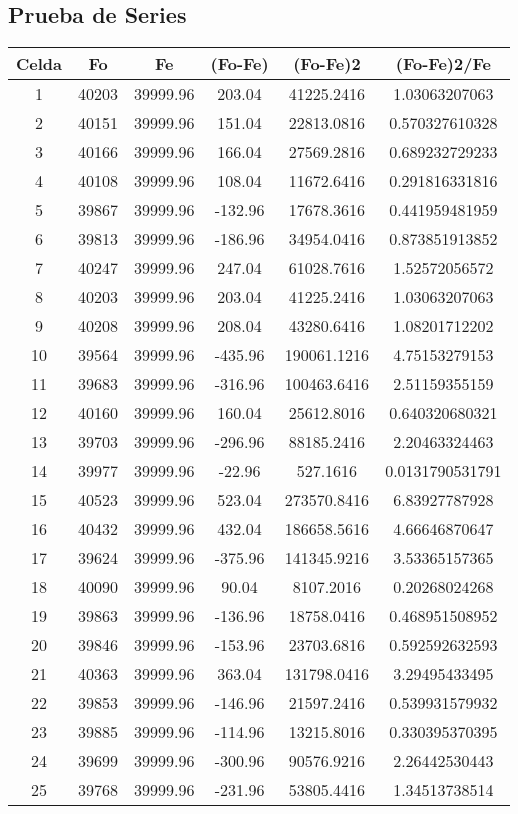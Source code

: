 \documentclass{article}
\begin{document}
\subsection{Prueba de Series}
\begin{tabular}{|c|c|c|c|c|c|}
Celda&Fo&Fe&(Fo{-}Fe)&(Fo{-}Fe)2&(Fo{-}Fe)2/Fe\\
\hline
1&40203&39999.96&203.04&41225.2416&1.03063207063\\
\hline
2&40151&39999.96&151.04&22813.0816&0.570327610328\\
\hline
3&40166&39999.96&166.04&27569.2816&0.689232729233\\
\hline
4&40108&39999.96&108.04&11672.6416&0.291816331816\\
\hline
5&39867&39999.96&{-}132.96&17678.3616&0.441959481959\\
\hline
6&39813&39999.96&{-}186.96&34954.0416&0.873851913852\\
\hline
7&40247&39999.96&247.04&61028.7616&1.52572056572\\
\hline
8&40203&39999.96&203.04&41225.2416&1.03063207063\\
\hline
9&40208&39999.96&208.04&43280.6416&1.08201712202\\
\hline
10&39564&39999.96&{-}435.96&190061.1216&4.75153279153\\
\hline
11&39683&39999.96&{-}316.96&100463.6416&2.51159355159\\
\hline
12&40160&39999.96&160.04&25612.8016&0.640320680321\\
\hline
13&39703&39999.96&{-}296.96&88185.2416&2.20463324463\\
\hline
14&39977&39999.96&{-}22.96&527.1616&0.0131790531791\\
\hline
15&40523&39999.96&523.04&273570.8416&6.83927787928\\
\hline
16&40432&39999.96&432.04&186658.5616&4.66646870647\\
\hline
17&39624&39999.96&{-}375.96&141345.9216&3.53365157365\\
\hline
18&40090&39999.96&90.04&8107.2016&0.20268024268\\
\hline
19&39863&39999.96&{-}136.96&18758.0416&0.468951508952\\
\hline
20&39846&39999.96&{-}153.96&23703.6816&0.592592632593\\
\hline
21&40363&39999.96&363.04&131798.0416&3.29495433495\\
\hline
22&39853&39999.96&{-}146.96&21597.2416&0.539931579932\\
\hline
23&39885&39999.96&{-}114.96&13215.8016&0.330395370395\\
\hline
24&39699&39999.96&{-}300.96&90576.9216&2.26442530443\\
\hline
25&39768&39999.96&{-}231.96&53805.4416&1.34513738514\\
\end{tabular}
\end{document}
